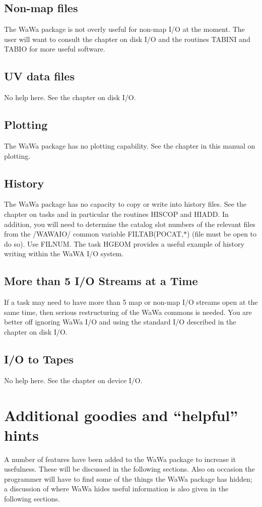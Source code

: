 \subsection{Non-map files}
The WaWa package is not overly useful for non-map I/O at the moment.
The user will want to consult the chapter on disk I/O and the routines
TABINI and TABIO for more useful software.

\subsection{UV data files}
No help here. See the chapter on disk I/O.


\subsection{Plotting}
The WaWa package has no plotting capability.  See the chapter in this
manual on plotting.


\subsection{History}
The WaWa package has no capacity to copy or write into history files.
See the chapter on tasks and in particular the routines HISCOP and
HIADD.  In addition, you will need to determine the catalog slot
numbers of the relevant files from the /WAWAIO/ common variable
FILTAB(POCAT,$\ast$)  (file must be open to do so).  Use FILNUM. The task
HGEOM provides a useful example of history writing within the WaWA I/O
system.


\subsection{More than 5 I/O Streams at a Time}
If a task may need to have more than 5 map or non-map I/O streams open
at the same time, then serious restructuring of the WaWa commons is
needed.  You are better off ignoring WaWa I/O and using the standard
I/O described in the chapter on disk I/O.


\subsection{I/O to Tapes}
No help here.  See the chapter on device I/O.


\section{Additional goodies and ``helpful'' hints}
A number of features have been added to the WaWa package to increase
it usefulness.  These will be discussed in the following sections.
Also on occasion the programmer will have to find some of the things
the WaWa package has hidden; a discussion of where WaWa hides useful
information is also given in the following sections.

